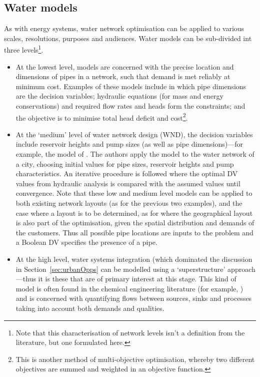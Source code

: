 \subsection{Water models}
As with energy systems, water network optimisation can be applied to various scales, resolutions, purposes and audiences. Water models can be sub-divided int three levels\footnote{Note that this characterisation of network levels isn't a definition from the literature, but one formulated here.}. 
\begin{itemize} 
	\item At the lowest level, models are concerned with the precise location and dimensions of pipes in a network, such that demand is met reliably at minimum cost. Examples of these models include \citet{Keedwell2005} in which pipe dimensions are the decision variables; hydraulic equations (for mass and energy conservations) and required flow rates and heads form the constraints; and the objective is to minimise total head deficit and cost\footnote{This is another method of multi-objective optimisation, whereby two different objectives are summed and weighted in an objective function.}. 
	\item At the `medium' level of water network design (WND), the decision variables include reservoir heights and pump sizes (as well as pipe dimensions)---for example, the model of \citet{Zangenah2010}. The authors apply the model to the water network of a city, choosing initial values for pipe sizes, reservoir heights and pump characteristics. An iterative procedure is followed where the optimal DV values from hydraulic analysis is compared with the assumed values until convergence. Note that these low and medium level models can be applied to both existing network layouts (as for the previous two examples), and the case where a layout is to be determined, as for \citet{Lejano2006} where the geographical layout is also part of the optimisation, given the spatial distribution and demands of the customers. Thus all possible pipe locations are inputs to the problem and a Boolean DV specifies the presence of a pipe. 
	\item At the high level, water systems integration (which dominated the discussion in Section~\ref{sec:urbanOpps} can be modelled using a `superstructure' approach---thus it is these that are of primary interest at this stage. This kind of model is often found in the chemical engineering literature (for example, \citet{Khor2012}) and is concerned with quantifying flows between sources, sinks and processes taking into account both demands and qualities. 
\end{itemize}
